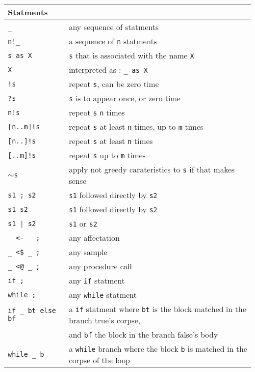 \begin{tabular}{| l | l |}
  \hline
  Statments&\\
  \hline
  \texttt{\_} & any sequence of statments \\
  \texttt{n!\_} & a sequence of  \texttt{n} statments \\
  \texttt{s as X} &  \texttt{s} that is associated with the name  \texttt{X}\\
  \texttt{X} & interpreted as : \texttt{\_ as X} \\
  \hline
  \texttt{!s} & repeat  \texttt{s}, can be zero time \\
  \texttt{?s} &  \texttt{s} is to appear once, or zero time \\
  \texttt{n!s} & repeat  \texttt{s}  \texttt{n} times \\
  \texttt{[n..m]!s} & repeat  \texttt{s} at least  \texttt{n} times, up to  \texttt{m} times \\
  \texttt{[n..]!s} & repeat  \texttt{s} at least  \texttt{n} times \\
  \texttt{[..m]!s} & repeat  \texttt{s} up to  \texttt{m} times \\
  \texttt{$\sim$s} & apply not greedy carateristics to  \texttt{s} if that makes sense\\
  \hline
  \texttt{s1 ; s2} &  \texttt{s1} followed directly by  \texttt{s2} \\
  \texttt{s1 s2} &  \texttt{s1} followed directly by  \texttt{s2} \\
  \texttt{s1 | s2} &  \texttt{s1} or  \texttt{s2} \\
  \hline
  \texttt{\_ <- \_ ;} & any affectation \\
  \texttt{\_ <\$ \_ ;} & any sample \\
  \texttt{\_ <@ \_ ;} & any procedure call \\
  \texttt{if ;} & any  \texttt{if} statment \\
  \texttt{while ;} & any  \texttt{while} statment \\
  \texttt{if \_ bt else bf} & a \texttt{if} statment where  \texttt{bt} is the 
  block matched in the branch true's corpse,\\
  & and  \texttt{bf} the block in the branch false's body\\
  \texttt{while \_ b} & a \texttt{while} branch where the block  \texttt{b}
  is matched in the corpse of the loop\\
  \hline
\end{tabular}




